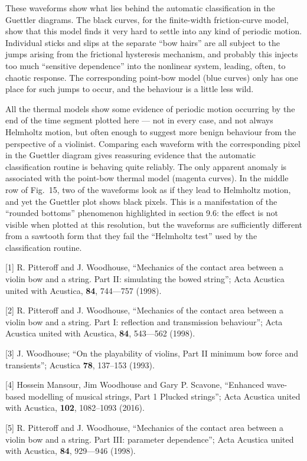   These waveforms show what lies behind the automatic classification in the 
  Guettler diagrams. The black curves, for the finite-width friction-curve 
  model, show that this model finds it very hard to settle into any kind of 
  periodic motion. Individual sticks and slips at the separate “bow hairs” are 
  all subject to the jumps arising from the frictional hysteresis mechanism, 
  and probably this injects too much “sensitive dependence” into the nonlinear 
  system, leading, often, to chaotic response. The corresponding point-bow 
  model (blue curves) only has one place for such jumps to occur, and the 
  behaviour is a little less wild. 

  All the thermal models show some evidence of periodic motion occurring by the 
  end of the time segment plotted here — not in every case, and not always 
  Helmholtz motion, but often enough to suggest more benign behaviour from the 
  perspective of a violinist. Comparing each waveform with the corresponding 
  pixel in the Guettler diagram gives reassuring evidence that the automatic 
  classification routine is behaving quite reliably. The only apparent anomaly 
  is associated with the point-bow thermal model (magenta curves). In the 
  middle row of Fig.\ 15, two of the waveforms look as if they lead to 
  Helmholtz motion, and yet the Guettler plot shows black pixels. This is a 
  manifestation of the “rounded bottoms” phenomenon highlighted in section 9.6: 
  the effect is not visible when plotted at this resolution, but the waveforms 
  are sufficiently different from a sawtooth form that they fail the “Helmholtz 
  test” used by the classification routine. 

  \sectionreferences{}[1] R. Pitteroff and J. Woodhouse, “Mechanics of the 
  contact area between a violin bow and a string. Part II: simulating the bowed 
  string”; Acta Acustica united with Acustica, \textbf{84}, 744—757 (1998). 

  [2] R. Pitteroff and J. Woodhouse, “Mechanics of the contact area between a 
  violin bow and a string. Part I: reflection and transmission behaviour”; Acta 
  Acustica united with Acustica, \textbf{84}, 543—562 (1998). 

  [3] J. Woodhouse; “On the playability of violins, Part II minimum bow force 
  and transients”; Acustica \textbf{78}, 137–153 (1993). 

  [4] Hossein Mansour, Jim Woodhouse and Gary P. Scavone, “Enhanced wave-based 
  modelling of musical strings, Part 1 Plucked strings”; Acta Acustica united 
  with Acustica, \textbf{102}, 1082–1093 (2016). 

  [5] R. Pitteroff and J. Woodhouse, “Mechanics of the contact area between a 
  violin bow and a string. Part III: parameter dependence”; Acta Acustica 
  united with Acustica, \textbf{84}, 929—946 (1998). 